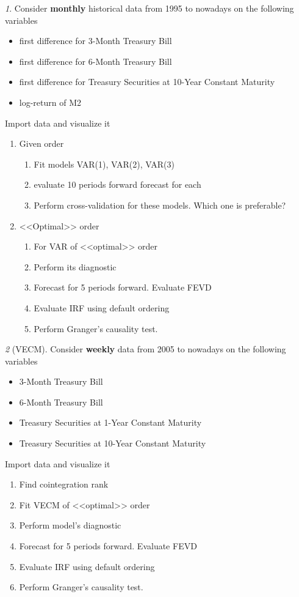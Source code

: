 \documentclass[12pt]{article}
\theoremstyle{remark}
\newtheorem{exercise}{}[section]
\begin{document}
\begin{exercise}
Consider \textbf{monthly} historical data from 1995 to nowadays on the following variables
\begin{itemize}
	\item first difference for 3-Month Treasury Bill
	\item first difference for 6-Month Treasury Bill
	\item first difference for Treasury Securities at 10-Year Constant Maturity
	\item log-return of M2
\end{itemize}
Import data and visualize it
\begin{enumerate}
	\item Given order
	\begin{enumerate}
		\item Fit models VAR(1), VAR(2), VAR(3)
		\item evaluate 10 periods forward forecast for each 
		\item Perform cross-validation for these models. Which one is preferable?
	\end{enumerate}
	\item <<Optimal>> order
	\begin{enumerate}
		\item For VAR of <<optimal>> order
		\item Perform its diagnostic
		\item Forecast for 5 periods forward. Evaluate FEVD
		\item Evaluate IRF using default ordering
		\item Perform Granger's causality test.
	\end{enumerate}
\end{enumerate}
\end{exercise}

\begin{exercise}[VECM]
Consider \textbf{weekly} data from 2005 to nowadays on the following variables
\begin{itemize}
	\item 3-Month Treasury Bill
	\item 6-Month Treasury Bill
	\item Treasury Securities at 1-Year Constant Maturity
	\item Treasury Securities at 10-Year Constant Maturity
\end{itemize}
Import data and visualize it
\begin{enumerate}
	\item Find cointegration rank
	\item Fit VECM of <<optimal>> order
	\item Perform model's diagnostic
	\item Forecast for 5 periods forward. Evaluate FEVD
	\item Evaluate IRF using default ordering
	\item Perform Granger's causality test.
\end{enumerate}
\end{exercise}
\end{document}
